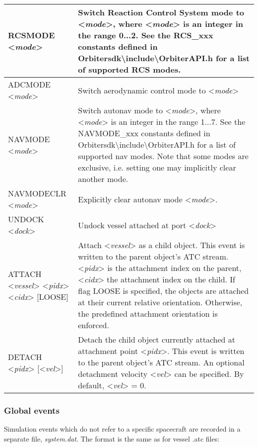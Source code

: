 \documentclass[Orbiter Technical Reference.tex]{subfiles}
\begin{document}
	\begin{longtable}{ |p{}|p{}| }
	\hline\rule{0pt}{2ex}
	RCSMODE <\textit{mode}> & Switch Reaction Control System mode to <\textit{mode}>, where <\textit{mode}> is an integer in the range 0...2. See the RCS\_xxx constants defined in Orbitersdk\textbackslash include\textbackslash OrbiterAPI.h for a list of supported RCS modes.\\
	\hline\rule{0pt}{2ex}
	ADCMODE <\textit{mode}> & Switch aerodynamic control mode to <\textit{mode}>\\
	\hline\rule{0pt}{2ex}
	NAVMODE <\textit{mode}> & Switch autonav mode to <\textit{mode}>, where <\textit{mode}> is an integer in the range 1...7. See the NAVMODE\_xxx constants defined in Orbitersdk\textbackslash include\textbackslash OrbiterAPI.h for a list of supported nav modes. Note that some modes are exclusive, i.e. setting one may implicitly clear another mode.\\
	\hline\rule{0pt}{2ex}
	NAVMODECLR <\textit{mode}> & Explicitly clear autonav mode <\textit{mode}>.\\
	\hline\rule{0pt}{2ex}
	UNDOCK <\textit{dock}> & Undock vessel attached at port <\textit{dock}>\\
	\hline\rule{0pt}{2ex}
	ATTACH <\textit{vessel}> <\textit{pidx}> <\textit{cidx}> [LOOSE] & Attach <\textit{vessel}> as a child object. This event is written to the parent object's ATC stream. <\textit{pidx}> is the attachment index on the parent, <\textit{cidx}> the attachment index on the child. If flag LOOSE is specified, the objects are attached at their current relative orientation. Otherwise, the predefined attachment orientation is enforced.\\
	\hline\rule{0pt}{2ex}
	DETACH <\textit{pidx}> [<\textit{vel}>] & Detach the child object currently attached at attachment point <\textit{pidx}>. This event is written to the parent object's ATC stream. An optional detachment velocity <\textit{vel}> can be specified. By default, <\textit{vel}> = 0.\\
	\hline
	\end{longtable}


\subsubsection{Global events}
Simulation events which do not refer to a specific spacecraft are recorded in a separate file, \textit{system.dat}. The format is the same as for vessel .atc files:
\end{document}
